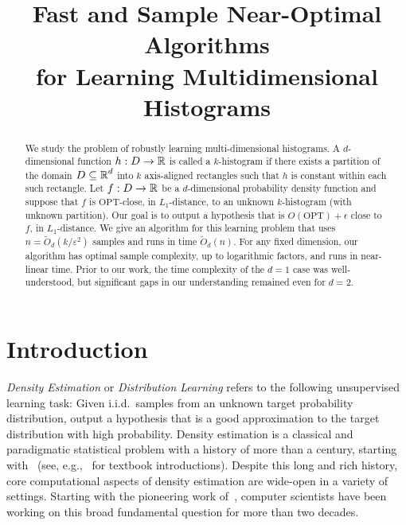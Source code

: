 \documentclass[final,12pt]{colt2018} %
\title[Learning Multidimensional Histograms]{Fast and Sample Near-Optimal Algorithms\\ 
for Learning Multidimensional Histograms}
\newcommand{\eps}{\varepsilon}
\begin{document}
\maketitle


\begin{abstract}
We study the problem of robustly learning multi-dimensional histograms. 
A $d$-dimensional function $h: D \to \operatorname{\mathbb{R}}$ is called a $k$-histogram if there exists a partition of the 
domain $D \subseteq \operatorname{\mathbb{R}}^d$ into $k$ axis-aligned rectangles such that $h$ is constant within each such rectangle.
Let $f: D \to \operatorname{\mathbb{R}}$ be a $d$-dimensional probability density function 
and suppose that $f$ is $\mathrm{OPT}$-close, in $L_1$-distance, 
to an unknown $k$-histogram (with unknown partition). Our goal is to output a hypothesis
that is $O(\mathrm{OPT}) + \epsilon$ close to $f$, in $L_1$-distance. We give an algorithm for this learning 
problem that uses  $n = \tilde{O}_d(k/\eps^2)$ samples and runs in time $\tilde{O}_d(n)$.
For any fixed dimension, our algorithm has optimal sample complexity, up to logarithmic factors,
and runs in near-linear time. Prior to our work, the time complexity of the $d=1$ case was well-understood, 
but significant gaps in our understanding remained even for $d=2$.
\end{abstract}

\section{Introduction}  \label{sec:intro}



{\em Density Estimation} or {\em Distribution Learning} refers to the following unsupervised learning task:
Given i.i.d.\ samples from an unknown target probability distribution, output a hypothesis that is a good approximation to
the target distribution with high probability. Density estimation is a classical and paradigmatic statistical problem 
with a history of more than a century, starting with~\cite{Pearson} 
(see, e.g.,~\cite{BBBB:72, DG85, Silverman:86,Scott:92,DL:01} for textbook introductions).
Despite this long and rich history, core computational aspects of density estimation are wide-open in a variety of settings.
Starting with the pioneering work of~\cite{KMR+:94short}, computer scientists have been working on this broad fundamental question for more than two decades.
\end{document}
